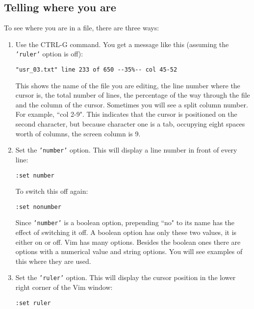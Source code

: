 \subsection{Telling where you are}
To see where you are in a file, there are three ways:
\begin{enumerate}
				\item  Use the CTRL-G command.
								You get a message like this (assuming the \texttt{'ruler'} option is off):
								\begin{Verbatim}[samepage=true]
	"usr_03.txt" line 233 of 650 --35%-- col 45-52
								\end{Verbatim}

								This shows the name of the file you are editing, the line number where the cursor is, the total number of lines, the percentage of the way through the file and the column of the cursor.
								Sometimes you will see a split column number.
								For example, ``col 2-9".
								This indicates that the cursor is positioned on the second character, but because character one is a tab, occupying eight spaces worth of columns, the screen column is 9.

				\item  Set the \texttt{'number'} option.  This will display a line number in front of
								every line:

								\begin{Verbatim}[samepage=true]
	:set number
								\end{Verbatim}

								To switch this off again:

								\begin{Verbatim}[samepage=true]
	:set nonumber
								\end{Verbatim}

								Since \texttt{'number'} is a boolean option, prepending ``no" to its name has the effect of switching it off.
								A boolean option has only these two values, it is either on or off.
								Vim has many options.
								Besides the boolean ones there are options with a numerical value and string options.
								You will see examples of this where they are used.

				\item  Set the \texttt{'ruler'} option.
								This will display the cursor position in the lower right corner of the Vim window:

								\begin{Verbatim}[samepage=true]
	:set ruler
								\end{Verbatim}

\end{enumerate}

